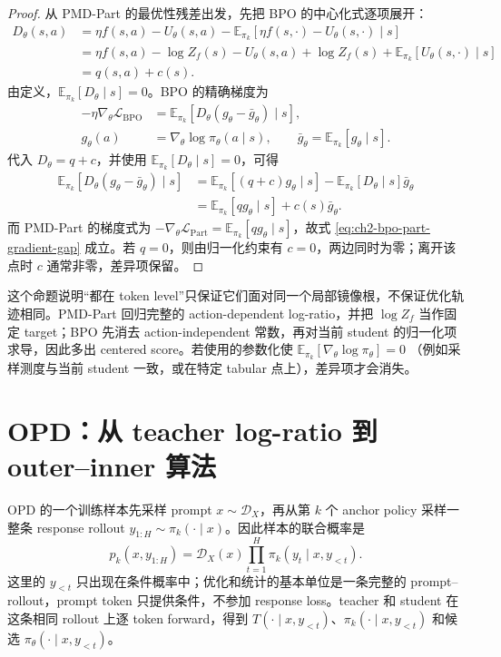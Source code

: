 \begin{proof}
从 PMD-Part 的最优性残差出发，先把 BPO 的中心化式逐项展开：
\begin{align*}
D_\theta(s,a)
&=\eta f(s,a)-U_\theta(s,a)
 -\mathbb E_{\pi_k}[\eta f(s,\cdot)-U_\theta(s,\cdot)\mid s]\\
&=\eta f(s,a)-\log Z_f(s)-U_\theta(s,a)
 +\log Z_f(s)+\mathbb E_{\pi_k}[U_\theta(s,\cdot)\mid s]\\
&=q(s,a)+c(s).
\end{align*}
由定义，$\mathbb E_{\pi_k}[D_\theta\mid s]=0$。BPO 的精确梯度为
\begin{align*}
-\eta\nabla_\theta\mathcal L_{\mathrm{BPO}}
&=\mathbb E_{\pi_k}\left[D_\theta
 \left(g_\theta-\bar g_\theta\right)\mid s\right],\\
 g_\theta(a)&=\nabla_\theta\log\pi_\theta(a\mid s),
 \qquad \bar g_\theta=\mathbb E_{\pi_k}[g_\theta\mid s].
\end{align*}
代入 $D_\theta=q+c$，并使用 $\mathbb E_{\pi_k}[D_\theta\mid s]=0$，可得
\begin{align*}
\mathbb E_{\pi_k}[D_\theta(g_\theta-\bar g_\theta)\mid s]
&=\mathbb E_{\pi_k}[(q+c)g_\theta\mid s]
 -\mathbb E_{\pi_k}[D_\theta\mid s]\bar g_\theta\\
&=\mathbb E_{\pi_k}[qg_\theta\mid s]+c(s)\bar g_\theta.
\end{align*}
而 PMD-Part 的梯度式为
$-\nabla_\theta\mathcal L_{\mathrm{Part}}=\mathbb E_{\pi_k}[qg_\theta\mid s]$，故式
\eqref{eq:ch2-bpo-part-gradient-gap}
成立。若 $q=0$，则由归一化约束有 $c=0$，两边同时为零；离开该点时 $c$ 通常非零，差异项保留。
\end{proof}

这个命题说明“都在 token level”只保证它们面对同一个局部镜像根，不保证优化轨迹相同。PMD-Part 回归完整的 action-dependent log-ratio，并把 $\log Z_f$ 当作固定 target；BPO 先消去 action-independent 常数，再对当前 student 的归一化项求导，因此多出 centered score。若使用的参数化使
$\mathbb E_{\pi_k}[\nabla_\theta\log\pi_\theta]=0$
（例如采样测度与当前 student 一致，或在特定 tabular 点上），差异项才会消失。

\section{OPD：从 teacher log-ratio 到 outer--inner 算法}
\label{sec:ch2-opd-instantiation}

OPD 的一个训练样本先采样 prompt $x\sim\mathcal D_X$，再从第 $k$ 个 anchor policy 采样一整条 response rollout
$y_{1:H}\sim\pi_k(\cdot\mid x)$。因此样本的联合概率是
\[
 p_k(x,y_{1:H})=\mathcal D_X(x)\prod_{t=1}^{H}
 \pi_k(y_t\mid x,y_{<t}).
\]
这里的 $y_{<t}$ 只出现在条件概率中；优化和统计的基本单位是一条完整的 prompt--rollout，prompt token 只提供条件，不参加 response loss。teacher 和 student 在这条相同 rollout 上逐 token forward，得到
$T(\cdot\mid x,y_{<t})$、$\pi_k(\cdot\mid x,y_{<t})$ 和候选
$\pi_\theta(\cdot\mid x,y_{<t})$。

